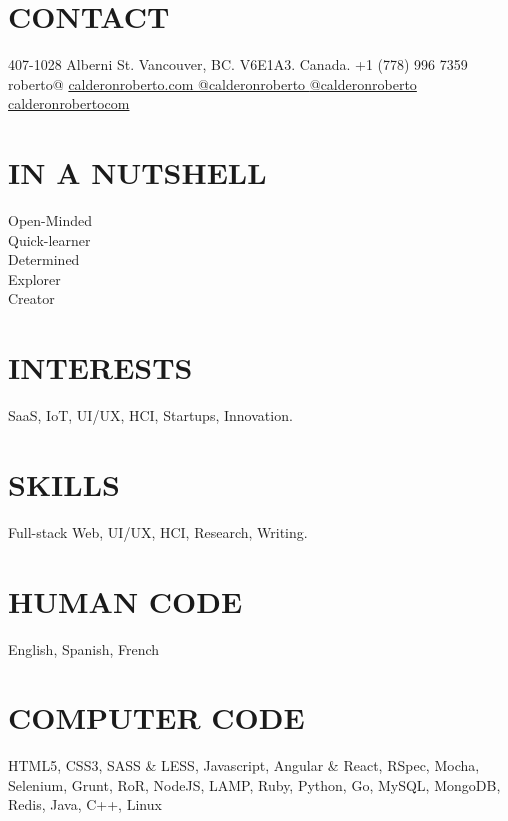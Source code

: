 \documentclass[full]{rvca}
\begin{document}

\begin{aside} %
\section{\uppercase{contact} }
407-1028 Alberni St.
Vancouver, BC.
V6E1A3. Canada.
+1 (778) 996 7359
\ghost
roberto@
\href{http://calderonroberto.com}{\color{sidebandtextcolor}calderonroberto.com \faGlobe}
\href{http://twitter.com/calderonroberto}{\color{sidebandtextcolor}@calderonroberto \faTwitter} 
\href{https://github.com/calderonroberto}{\color{sidebandtextcolor}@calderonroberto \faGithub} 
\href{https://ca.linkedin.com/in/calderonrobertocom}{\color{sidebandtextcolor}calderonrobertocom \faLinkedin} 
\ghost
\ghost
\section{\uppercase{in a nutshell}}
Open-Minded\\Quick-learner\\Determined\\Explorer\\Creator 
% 
\ghost
\section{\uppercase{interests}}
SaaS, IoT, UI/UX, HCI, Startups, Innovation.
%
\ghost
\section{\uppercase{skills}}
Full-stack Web, UI/UX, 
HCI, Research, Writing.
\ghost 
\section{\uppercase{human code}}
English, Spanish, French
\ghost
\section{\uppercase{computer code}}
HTML5, CSS3, SASS \& LESS, {\scriptsize\faHeart} Javascript,
Angular \& React, RSpec, Mocha, Selenium, Grunt,
{\scriptsize\faHeart} RoR, {\scriptsize\faHeart} NodeJS, LAMP,
Ruby, Python, {\scriptsize\faHeart} Go,
MySQL, MongoDB, Redis,
Java, C++, {\scriptsize\faHeart} Linux
\end{aside}


\end{document}
